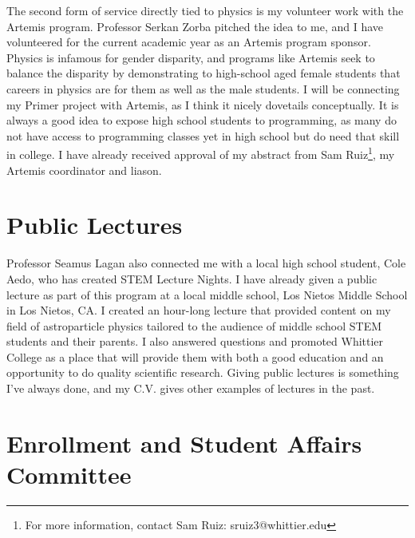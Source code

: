 \documentclass[../main.tex]{subfiles}
\begin{document}
The second form of service directly tied to physics is my volunteer work with the Artemis program.  Professor Serkan Zorba pitched the idea to me, and I have volunteered for the current academic year as an Artemis program sponsor.  Physics is infamous for gender disparity, and programs like Artemis seek to balance the disparity by demonstrating to high-school aged female students that careers in physics are for them as well as the male students.  I will be connecting my Primer project with Artemis, as I think it nicely dovetails conceptually.  It is always a good idea to expose high school students to programming, as many do not have access to programming classes yet in high school but do need that skill in college.  I have already received approval of my abstract from Sam Ruiz\footnote{For more information, contact Sam Ruiz: sruiz3@whittier.edu}, my Artemis coordinator and liason. \\ \hspace{0.1cm}

\section{Public Lectures}

Professor Seamus Lagan also connected me with a local high school student, Cole Aedo, who has created STEM Lecture Nights.  I have already given a public lecture as part of this program at a local middle school, Los Nietos Middle School in Los Nietos, CA.  I created an hour-long lecture that provided content on my field of astroparticle physics tailored to the audience of middle school STEM students and their parents.  I also answered questions and promoted Whittier College as a place that will provide them with both a good education and an opportunity to do quality scientific research.  Giving public lectures is something I've always done, and my C.V. gives other examples of lectures in the past.

\section{Enrollment and Student Affairs Committee}
\end{document}
